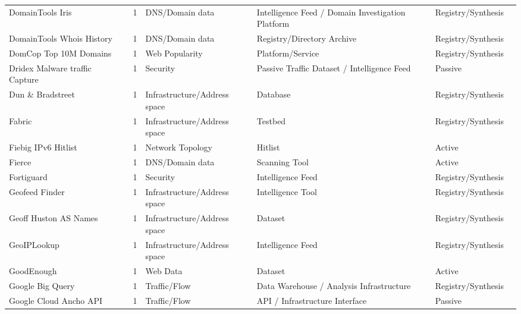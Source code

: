 \begin{table}[h!]
\begin{tabular}{lllllll}
DomainTools Iris & \cite{domaintools-iris} & 1 & DNS/Domain data & Intelligence Feed / Domain Investigation Platform & Registry/Synthesis & \cite{10.1145/3517745.3561425} \\
DomainTools Whois History & \cite{domaintools-whois} & 1 & DNS/Domain data & Registry/Directory Archive & Registry/Synthesis & \cite{10.1145/3487552.3487816} \\
DomCop Top 10M Domains & \cite{domcop} & 1 & Web Popularity & Platform/Service & Registry/Synthesis & \cite{10.1145/3777912.3839797} \\
Dridex Malware traffic Capture & \cite{dridex-malware-traffic} & 1 & Security & Passive Traffic Dataset / Intelligence Feed & Passive & \cite{10.1007/978-3-031-28486-1_5} \\
Dun \& Bradstreet & \cite{dnb} & 1 & Infrastructure/Address space & Database & Registry/Synthesis & \cite{10.1145/3487552.3487853} \\
Fabric & \cite{fabric-framework} & 1 & Infrastructure/Address space & Testbed & Registry/Synthesis & \cite{10.1145/3646547.3688441} \\
Fiebig IPv6 Hitlist & \cite{fiebig-ipv6} & 1 & Network Topology & Hitlist & Active & \cite{10.1145/3646547.3688420} \\
Fierce & \cite{fierce-scanner} & 1 & DNS/Domain data & Scanning Tool & Active & \cite{10.1007/978-3-031-56249-5_4} \\
Fortiguard & \cite{fortiguard} & 1 & Security & Intelligence Feed & Registry/Synthesis & \cite{10.1145/3777912.3839787} \\
Geofeed Finder & \cite{geofeed_finder} & 1 & Infrastructure/Address space & Intelligence Tool & Registry/Synthesis & \cite{10.1007/978-3-031-56252-5_11} \\
Geoff Huston AS Names & \cite{huston_as_names} & 1 & Infrastructure/Address space & Dataset & Registry/Synthesis & \cite{10.1007/978-3-030-98785-5_9} \\
GeoIPLookup & \cite{geoip_lookup} & 1 & Infrastructure/Address space & Intelligence Feed & Registry/Synthesis & \cite{10.1145/3487552.3487854} \\
GoodEnough & \cite{goodenough} & 1 & Web Data & Dataset & Active & \cite{10.1007/978-3-032-18268-5_13} \\
Google Big Query & \cite{google_bigquery} & 1 & Traffic/Flow & Data Warehouse / Analysis Infrastructure & Registry/Synthesis & \cite{10.1007/978-3-030-98785-5_30} \\
Google Cloud Ancho API & \cite{google_ancho_api} & 1 & Traffic/Flow & API / Infrastructure Interface & Passive & \cite{10.1007/978-3-030-98785-5_8} \\

\end{tabular}
\end{table}
